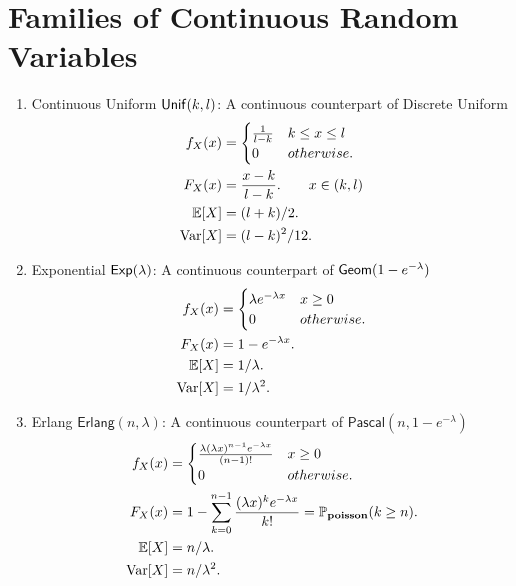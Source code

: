 \section{Families of Continuous Random Variables}
\begin{enumerate}
    \item Continuous Uniform $\mathsf{Unif}(k,l)$: A continuous counterpart of Discrete Uniform {
        \begin{align*}
            f_X(x) 
            &= {
                \begin{cases}
                \frac{1}{l-k} & k\leq x \leq l \\
                0             & otherwise.
                \end{cases} } \\
            F_X(x) 
            &= \frac{x-k}{l-k}. \qquad x\in (k,l)\\
            \E{X}
            &= (l+k)/2. \\
            \Var[X] 
            &= (l-k)^2/12. \\
        \end{align*}
    }
    \item Exponential $\mathsf{Exp}(\lambda)$: A continuous counterpart of $\mathsf{Geom}(1-e^{-\lambda})$ {
        \begin{align*}
            f_X(x) 
            &= {
                \begin{cases}
                    \lambda e^{-\lambda x} & x\geq 0 \\
                    0                      & otherwise.
                \end{cases}
            } \\
            F_X(x) 
            &= 1-e^{-\lambda x}. \\
            \E{X} 
            &= 1/\lambda. \\
            \Var[X]
            &= 1/\lambda^2.
        \end{align*}
    }
    \item Erlang $\mathsf{Erlang}(n,\lambda)$: A continuous counterpart of  $\mathsf{Pascal}(n,1-e^{-\lambda})${
        \begin{align*}
            f_X(x)
            &= {
                \begin{cases}
                    \frac{\lambda (\lambda x)^{n-1}e^{-\lambda x}}{(n-1)!} & x\geq 0 \\
                    0      & otherwise.
                \end{cases}
            } \\
            F_X(x)
            &= 1-\sum_{k=0}^{n-1}\frac{(\lambda x)^ke^{-\lambda x}}{k!} = \mathbb{P}_{\mathbf{poisson}}(k\geq n). \\
            \E{X}
            &= n/\lambda. \\
            \Var[X]
            &= n/\lambda^2.
        \end{align*}
    }
\end{enumerate}


